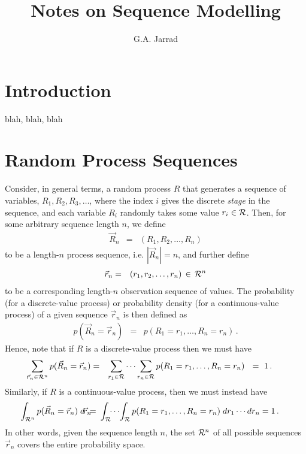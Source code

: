\documentclass[a4paper]{article}
\title{Notes on Sequence Modelling}
\author{G.A. Jarrad}
\begin{document}
\maketitle
{}
\section{Introduction}\label{sec:intro}
blah, blah, blah

\section{Random Process Sequences}
\label{sec:random-processes}
Consider, in general terms, a random process $R$ that generates a sequence of variables,
$R_1,R_2,R_3,\ldots$, where the index $i$ gives the discrete {\em stage} in the sequence,
and each variable $R_i$ randomly takes some value $r_i\in{\cal R}$.
Then, for some arbitrary sequence length $n$, we define
\begin{eqnarray}
\vec{R}_n & = & (R_1,R_2,\ldots,R_n)
\end{eqnarray}
 to be a length-$n$ process sequence, i.e. $|\!\vec{R}_n\!|=n$,
and further define
\begin{eqnarray}
\vec{r}_n & = & (r_1,r_2,\ldots,r_n)\,\in\,{\cal R}^n
\end{eqnarray}
to be a corresponding length-$n$ observation sequence of values.
The probability (for a discrete-value process) or probability density (for a continuous-value process) 
of a given sequence $\vec{r}_n$ is then defined as
\begin{eqnarray}
p(\vec{R}_n=\vec{r}_n)
& = & p(R_1=r_1,\ldots,R_n=r_n)\,.
\end{eqnarray}
Hence, note that if $R$ is a discrete-value process then we must have
\begin{eqnarray}
\hspace*{-5mm}
\sum_{\vec{r}_n\in{\cal R}^n}
p(\vec{R}_n=\vec{r}_n)
& = & \sum_{r_1\in{\cal R}}\cdots\sum_{r_n\in{\cal R}}
p(R_1=r_1,\ldots,R_n=r_n)~~=~1\,.
\end{eqnarray}
Similarly, if $R$ is a continuous-value process, then we must instead have
\begin{eqnarray}
\hspace*{-5mm}
\int_{{\cal R}^n}
p(\vec{R}_n=\vec{r}_n)
\;d\!\vec{r}_n
& \!\!\!=\!\!\! & \int_{\cal R}\!\!\cdots\!\int_{\cal R}
p(R_1=r_1,\ldots,R_n=r_n)\;dr_1\cdots dr_n=1\,.
\end{eqnarray}
In other words, given the sequence length $n$, the set ${\cal R}^n$ of all possible sequences
$\vec{r}_n$ covers the entire probability space.
\end{document}

